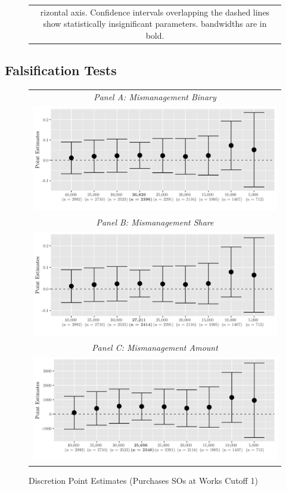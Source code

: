 \documentclass[11pt]{article}
\begin{document}
\begin{figure}[!htbp]
\begin{tabular}{c}
rizontal axis. Confidence intervals overlapping the dashed lines show statistically insignificant parameters. \citet{CattaneoInterpretingRegressionDiscontinuity2016,CattaneoAnalysisRegressionDiscontinuity2018} bandwidths are in bold.}
  \end{tabular}
\end{figure}

\newpage

\subsection{Falsification Tests} \label{subsec:discussion}

\begin{figure}[!htbp]
  \caption{Discretion Point Estimates (Purchases SOs at Works Cutoff 1)}
  \label{fig:01falsification}
  \centering
  \small
  \begin{tabular}{c}
  \emph{Panel A: Mismanagement Binary} \\
  \includegraphics[scale = .15]{01falsificationplot1} \\
  \emph{Panel B: Mismanagement Share} \\
  \includegraphics[scale = .15]{01falsificationplot2} \\
  \emph{Panel C: Mismanagement Amount} \\
  \includegraphics[scale = .15]{01falsificationplot3} \\

\end{tabular}
\end{figure}
\end{document}
